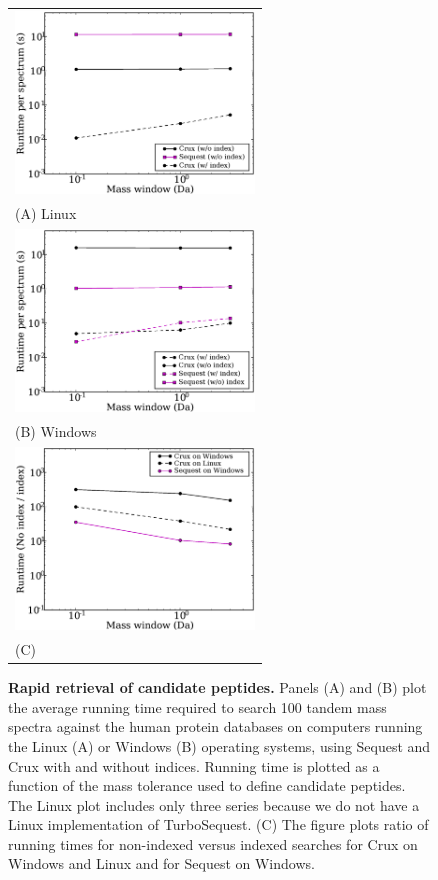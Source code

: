 \documentclass[12pt]{article}
\begin{document}
\begin{figure}
\centering
\begin{tabular}{l}
\includegraphics[width=2.5in]{../../results/paper-figure/index/indexing-human.eps} \\
{\sf (A)} Linux \\
\includegraphics[width=2.5in]{../../results/paper-figure/turbo-no-missed-human/indexing-yeast-windows.eps} \\
{\sf (B)} Windows \\
\includegraphics[width=2.5in]{../../results/paper-figure/comparison/ratio.eps} \\
{\sf (C)} \\
\end{tabular}
\caption{{\bf Rapid retrieval of candidate peptides.}  Panels (A) and
  (B) plot the average running time required to search 100 tandem mass
  spectra against the human protein databases on computers running the
  Linux ({\sf A}) or Windows ({\sf B}) operating systems, using {\sc
  Sequest} and Crux with and without indices.  Running time is plotted
  as a function of the mass tolerance used to define candidate
  peptides. The Linux plot includes only three series because we do
  not have a Linux implementation of Turbo{\sc Sequest}.  {\sf (C)} The
  figure plots ratio of running times for non-indexed versus indexed
  searches for Crux on Windows and Linux and for {\sc Sequest} on Windows.
  \label{figure:indexing}}
\end{figure}
\end{document}
